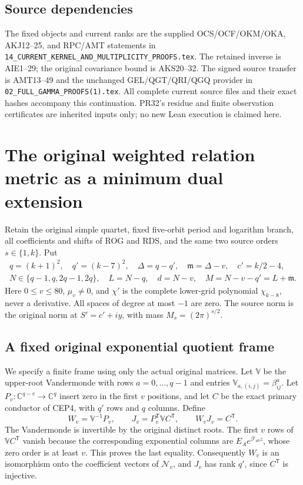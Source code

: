 \documentclass[11pt,a4paper]{article}
\begin{document}
\subsection*{Source dependencies}
The fixed objects and current ranks are the supplied OCS/OCF/OKM/OKA,
AKJ12--25, and RPC/AMT statements in \texttt{14\_CURRENT\_KERNEL\_AND\_MULTIPLICITY\_PROOFS.tex}.
The retained inverse is AIE1--29; the original covariance bound is
AKS20--32. The signed source transfer is AMT13--49 and the unchanged
GEL/QGT/QRI/QGQ provider in \texttt{02\_FULL\_GAMMA\_PROOFS(1).tex}.
All complete current source files and their exact hashes accompany this
continuation. PR32's residue and finite observation certificates are
inherited inputs only; no new Lean execution is claimed here.



\clearpage
\section{The original weighted relation metric as a minimum dual extension}
\label{sec:DNE}

Retain the original simple quartet, fixed five-orbit period and
logarithm branch, all coefficients and shifts of ROG and RDS, and
the same two source orders $s\in\{1,k\}$. Put
\[
 \begin{gathered}
 q=(k+1)^2,\quad q'=(k-7)^2,\quad
 \Delta=q-q',\quad \mathfrak m=\Delta-v,\quad c'=k/2-4,\\
 N\in\{q-1,q,2q-1,2q\},\quad L=N-q,\quad
 d=N-v,\quad M=N-v-q'=L+\mathfrak m .
 \end{gathered}\tag{DNE1}
\]
Here $0\le v\le80$, $\mu_v\ne0$, and $\chi'$ is the complete
lower-grid polynomial $\chi_{k-8}$, never a derivative.
All spaces of degree at most $-1$ are zero. The source norm is
the original norm at $S'=c'+iy$, with mass $M_s=(2\pi)^{s/2}$.

\subsection{A fixed original exponential quotient frame}

We specify a finite frame using only the actual original matrices.
Let $\mathbb V$ be the upper-root Vandermonde with rows
$a=0,\ldots,q-1$ and entries
$\mathbb V_{a,(i,j)}=\beta_{ij}^{a}$.
Let $P_v:\mathbb C^{q-v}\to\mathbb C^q$ insert zero in the
first $v$ positions, and let $C$ be the exact primary conductor
of CEP4, with $q'$ rows and $q$ columns. Define
\[
 W_v=\mathbb V^{-1}P_v,\qquad
 J_v=P_v^{\mathsf T}\mathbb V C^{\mathsf T},\qquad
 W_vJ_v=C^{\mathsf T}.
 \tag{DNE2}
\]
The Vandermonde is invertible by the original distinct roots.
The first $v$ rows of $\mathbb V C^{\mathsf T}$ vanish because
the corresponding exponential columns are
$E_Ae^{\beta'_{ab}z}$, whose zero order is at least $v$.
This proves the last equality. Consequently $W_v$ is an
isomorphism onto the coefficient vectors of $\mathscr N_v$,
and $J_v$ has rank $q'$, since $C^{\mathsf T}$ is injective.
\end{document}

